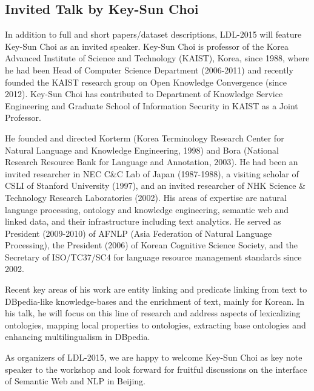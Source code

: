\subsection{Invited Talk by Key-Sun Choi}

In addition to full and short papers/dataset descriptions, LDL-2015 will feature Key-Sun Choi as an invited speaker. Key-Sun Choi is professor of the Korea Advanced Institute of Science and Technology (KAIST), Korea, since 1988, where he had been Head of Computer Science Department (2006-2011) and recently founded the KAIST research group on Open Knowledge Convergence (since 2012). Key-Sun Choi has contributed to Department of Knowledge Service Engineering and Graduate School of Information Security in KAIST as a Joint Professor.

He founded and directed Korterm (Korea Terminology Research Center for Natural Language and Knowledge Engineering, 1998) and Bora (National Research Resource Bank for Language and Annotation, 2003). He had been an invited researcher in NEC C\&C Lab of Japan (1987-1988), a visiting scholar of CSLI of Stanford University (1997), and an invited researcher of NHK Science \& Technology Research Laboratories (2002). His areas of expertise are natural language processing, ontology and knowledge engineering, semantic web and linked data, and their infrastructure including text analytics. He served as President (2009-2010) of AFNLP (Asia Federation of Natural Language Processing), the President (2006) of Korean Cognitive Science Society, and the Secretary of ISO/TC37/SC4 for language resource management standards since 2002. 

Recent key areas of his work are entity linking and predicate linking from text to DBpedia-like knowledge-bases and the enrichment of text, mainly for Korean. 
In his talk, he will focus on this line of research and address aspects of lexicalizing ontologies, mapping local properties to ontologies, extracting base ontologies and enhancing multilingualism in DBpedia.

As organizers of LDL-2015, we are happy to welcome Key-Sun Choi as key note speaker to the workshop and look forward for fruitful discussions on the interface of Semantic Web and NLP in Beijing.

